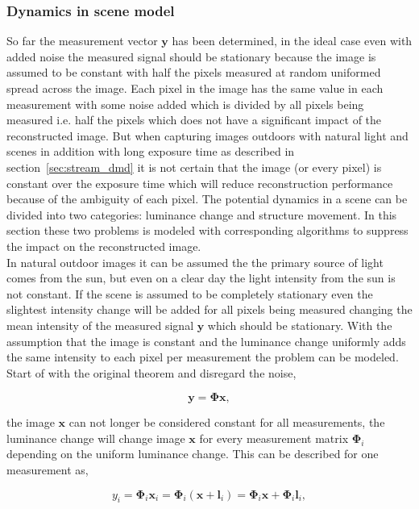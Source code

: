 \subsubsection{Dynamics in scene model}
So far the measurement vector $\mathbf{y}$ has been determined, in the ideal case even with added noise the measured signal should be stationary because the image is assumed to be constant with half the pixels measured at random uniformed spread across the image. Each pixel in the image has the same value in each measurement with some noise added which is divided by all pixels being measured	 i.e. half the pixels which does not have a significant impact of the reconstructed image. But when capturing images outdoors with natural light and scenes in addition with long exposure time as described in section~\ref{sec:stream_dmd} it is not certain that the image (or every pixel) is constant over the exposure time which will reduce reconstruction performance because of the ambiguity of each pixel. The potential dynamics in a scene can be divided into two categories: luminance change and structure movement. In this section these two problems is modeled with corresponding algorithms to suppress the 	impact on the reconstructed image.\\[0.1in] 


In natural outdoor images it can be assumed the the primary source of light comes from the sun, but even on a clear day the light intensity from the sun is not constant. If the scene is assumed to be completely stationary even the slightest intensity change will be added for all pixels being measured changing the mean intensity of the measured signal $\mathbf{y}$ which should be stationary. With the assumption that the image is constant and the luminance change uniformly adds the same intensity to each pixel per measurement the problem can be modeled.\\[0.1in]

Start of with the original theorem and disregard the noise, 

\begin{equation}
\mathbf{y} = \mathbf{\Phi}\mathbf{x},
\end{equation}  

the image $\mathbf{x}$ can not longer be considered constant for all measurements, the luminance change will change image $\mathbf{x}$ for every measurement matrix $\mathbf{\Phi}_i$ depending on the uniform luminance change. This can be described for one measurement as,  

\begin{equation}
y_i = \mathbf{\Phi}_i\mathbf{x}_i = \mathbf{\Phi}_i(\mathbf{x} + \mathbf{l}_i) = \mathbf{\Phi}_i\mathbf{x} + \mathbf{\Phi}_i\mathbf{l}_i ,
\end{equation}
  
